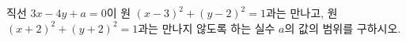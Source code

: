 직선 $3x-4y+a=0$이 원 $(x-3)^2+(y-2)^2=1$과는 만나고, 원 $(x+2)^2+(y+2)^2=1$과는 만나지 않도록 하는 실수 $a$의 값의 범위를 구하시오.
